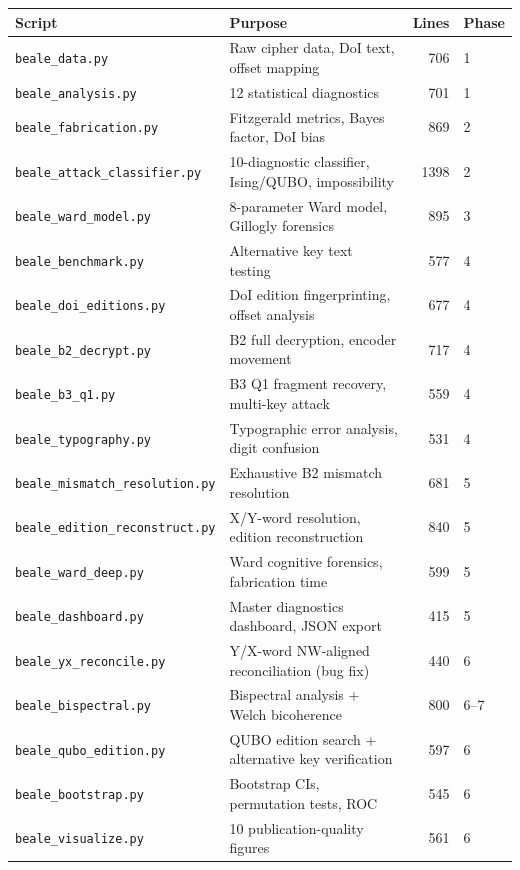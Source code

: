 \documentclass[11pt,a4paper]{article}
\begin{document}
\begin{center}
\small
\begin{tabular}{@{}llrl@{}}
\toprule
\textbf{Script} & \textbf{Purpose} & \textbf{Lines} & \textbf{Phase} \\
\midrule
\texttt{beale\_data.py} & Raw cipher data, DoI text, offset mapping & 706 & 1 \\
\texttt{beale\_analysis.py} & 12 statistical diagnostics & 701 & 1 \\
\texttt{beale\_fabrication.py} & Fitzgerald metrics, Bayes factor, DoI bias & 869 & 2 \\
\texttt{beale\_attack\_classifier.py} & 10-diagnostic classifier, Ising/QUBO, impossibility & 1398 & 2 \\
\texttt{beale\_ward\_model.py} & 8-parameter Ward model, Gillogly forensics & 895 & 3 \\
\texttt{beale\_benchmark.py} & Alternative key text testing & 577 & 4 \\
\texttt{beale\_doi\_editions.py} & DoI edition fingerprinting, offset analysis & 677 & 4 \\
\texttt{beale\_b2\_decrypt.py} & B2 full decryption, encoder movement & 717 & 4 \\
\texttt{beale\_b3\_q1.py} & B3 Q1 fragment recovery, multi-key attack & 559 & 4 \\
\texttt{beale\_typography.py} & Typographic error analysis, digit confusion & 531 & 4 \\
\texttt{beale\_mismatch\_resolution.py} & Exhaustive B2 mismatch resolution & 681 & 5 \\
\texttt{beale\_edition\_reconstruct.py} & X/Y-word resolution, edition reconstruction & 840 & 5 \\
\texttt{beale\_ward\_deep.py} & Ward cognitive forensics, fabrication time & 599 & 5 \\
\texttt{beale\_dashboard.py} & Master diagnostics dashboard, JSON export & 415 & 5 \\
\texttt{beale\_yx\_reconcile.py} & Y/X-word NW-aligned reconciliation (bug fix) & 440 & 6 \\
\texttt{beale\_bispectral.py} & Bispectral analysis + Welch bicoherence & 800 & 6--7 \\
\texttt{beale\_qubo\_edition.py} & QUBO edition search + alternative key verification & 597 & 6 \\
\texttt{beale\_bootstrap.py} & Bootstrap CIs, permutation tests, ROC & 545 & 6 \\
\texttt{beale\_visualize.py} & 10 publication-quality figures & 561 & 6 \\

\end{tabular}
\end{center}
\end{document}
